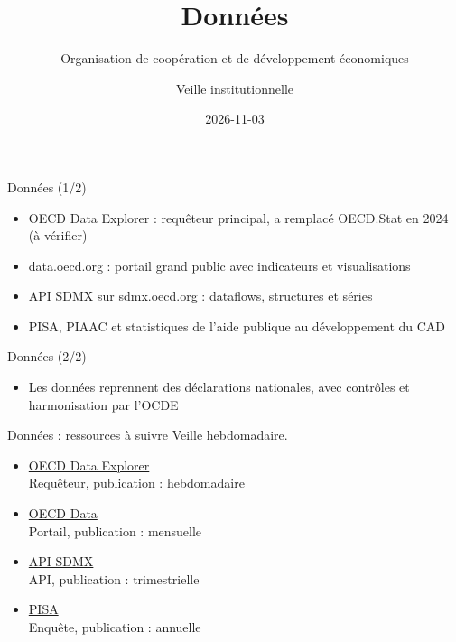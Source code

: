 \documentclass[aspectratio=169,11pt]{beamer}
\title{Données}
\subtitle{Organisation de coopération et de développement économiques}
\author{Veille institutionnelle}
\date{2026-11-03}
\begin{document}
\begin{frame}\titlepage\end{frame}

\begin{frame}{Données (1/2)}
\begin{itemize}
\item OECD Data Explorer : requêteur principal, a remplacé OECD.Stat en 2024 (à vérifier)
\item data.oecd.org : portail grand public avec indicateurs et visualisations
\item API SDMX sur sdmx.oecd.org : dataflows, structures et séries
\item PISA, PIAAC et statistiques de l'aide publique au développement du CAD
\end{itemize}
\end{frame}

\begin{frame}{Données (2/2)}
\begin{itemize}
\item Les données reprennent des déclarations nationales, avec contrôles et harmonisation par l'OCDE
\end{itemize}
\end{frame}

\begin{frame}{Données : ressources à suivre}
\small
Veille hebdomadaire.
\begin{itemize}
\item \href{https://data-explorer.oecd.org}{OECD Data Explorer}\\{\footnotesize Requêteur, publication : hebdomadaire}
\item \href{https://data.oecd.org}{OECD Data}\\{\footnotesize Portail, publication : mensuelle}
\item \href{https://sdmx.oecd.org/public/rest/dataflow}{API SDMX}\\{\footnotesize API, publication : trimestrielle}
\item \href{https://www.oecd.org/en/about/programmes/pisa.html}{PISA}\\{\footnotesize Enquête, publication : annuelle}
\end{itemize}
\end{frame}
\end{document}
